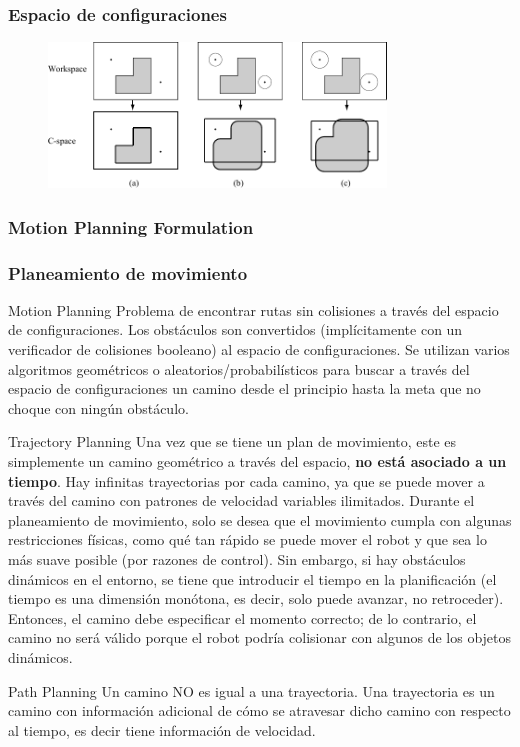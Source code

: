 \begin{frame}
	\frametitle{Espacio de configuraciones}
	
	\begin{figure}[!h]
		\includegraphics[width=0.8\textwidth]{images/workspace_configuration_space.pdf}
	\end{figure}
	
\end{frame}


\begin{frame}
	\frametitle{Motion Planning Formulation}
	
\end{frame}


\begin{frame}
	\frametitle{Planeamiento de movimiento}
	
	\begin{block}{Motion Planning}
		Problema de encontrar rutas sin colisiones a través del espacio de configuraciones. Los obstáculos son convertidos (implícitamente con un verificador de colisiones booleano) al espacio de configuraciones. Se utilizan varios algoritmos geométricos o aleatorios/probabilísticos para buscar a través del espacio de configuraciones un camino desde el principio hasta la meta que no choque con ningún obstáculo.
	\end{block}

	\begin{block}{Trajectory Planning}
		Una vez que se tiene un plan de movimiento, este es simplemente un camino geométrico a través del espacio, {\bf no está asociado a un tiempo}. Hay infinitas trayectorias por  cada camino, ya que se puede mover a través del camino con patrones de velocidad variables ilimitados. Durante el planeamiento de movimiento, solo se desea que el movimiento cumpla con algunas restricciones físicas, como qué tan rápido se puede mover el robot y que sea lo más suave posible (por razones de control). Sin embargo, si hay obstáculos dinámicos en el entorno, se tiene que introducir el tiempo en la planificación (el tiempo es una dimensión monótona, es decir, solo puede avanzar, no retroceder). Entonces, el camino debe especificar el momento correcto; de lo contrario, el camino no será válido porque el robot podría colisionar con algunos de los objetos dinámicos.
	\end{block}

	\begin{block}{Path Planning}
	Un camino NO es igual a una trayectoria. Una trayectoria es un camino con información adicional de cómo se atravesar dicho camino con respecto al tiempo, es decir tiene información de velocidad.
	\end{block}
\end{frame}


